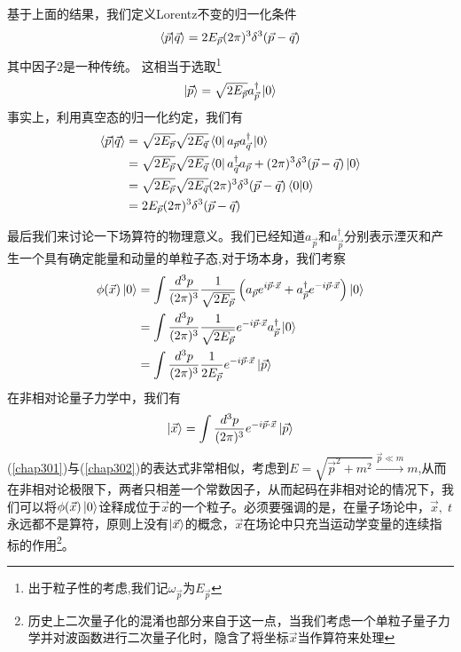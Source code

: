 基于上面的结果，我们定义Lorentz不变的归一化条件
\begin{equation}
    \braket{\vec{p}}{\vec{q}}=2E_{\vec{p}}(2\pi)^{3}\delta^{3}(\vec{p}-\vec{q})
\end{equation}
其中因子2是一种传统。
这相当于选取\footnote{出于粒子性的考虑,我们记$\omega_{\vec{p}}$为$E_{\vec{p}}$}
\begin{equation}
    \ket{\vec{p}}=\sqrt{2E_{\vec{p}}}a^{\dagger}_{\vec{p}}\ket{0}
\end{equation}
事实上，利用真空态的归一化约定，我们有
\begin{equation}
\begin{aligned}
     \braket{\vec{p}}{\vec{q}}&=\sqrt{2E_{\vec{p}}}\sqrt{2E_{\vec{q}}}\bra{0}a_{\vec{p}}a^{\dagger}_{\vec{q}}\ket{0}\\
     &=\sqrt{2E_{\vec{p}}}\sqrt{2E_{\vec{q}}}\bra{0}a^{\dagger}_{\vec{q}}a_{\vec{p}}+(2\pi)^{3}\delta^{3}(\vec{p}-\vec{q})\ket{0}\\
     &=\sqrt{2E_{\vec{p}}}\sqrt{2E_{\vec{q}}}(2\pi)^{3}\delta^{3}(\vec{p}-\vec{q})\braket{0}{0}\\
     &=2E_{\vec{p}}(2\pi)^{3}\delta^{3}(\vec{p}-\vec{q})
     \end{aligned}
\end{equation}

最后我们来讨论一下场算符的物理意义。我们已经知道$a_{\vec{p}}$和$a^{\dagger}_{\vec{p}}$分别表示湮灭和产生一个具有确定能量和动量的单粒子态,对于场本身，我们考察
\begin{equation}
\label{chap301}
\begin{aligned}
    \phi(\vec{x})\ket{0}&=\int \frac{d^{3}p}{(2\pi)^{3}}\frac{1}{\sqrt{2E_{\vec{p}}}}\left(a_{\vec{p}}e^{i\vec{p}\cdot\vec{x}}+a^{\dagger}_{\vec{p}}e^{-i\vec{p}\cdot\vec{x}}\right)\ket{0}\\
    &=\int \frac{d^{3}p}{(2\pi)^{3}}\frac{1}{\sqrt{2E_{\vec{p}}}}e^{-i\vec{p}\cdot\vec{x}}a^{\dagger}_{\vec{p}}\ket{0}\\
    &=\int \frac{d^{3}p}{(2\pi)^{3}}\frac{1}{2E_{\vec{p}}}e^{-i\vec{p}\cdot\vec{x}}\ket{\vec{p}}\\
    \end{aligned}
\end{equation}
在非相对论量子力学中，我们有
\begin{equation}
\label{chap302}
    \ket{\vec{x}}=\int \frac{d^{3}p}{(2\pi)^{3}}e^{-i\vec{p}\cdot\vec{x}}\ket{\vec{p}}
\end{equation}
(\ref{chap301})与(\ref{chap302})的表达式非常相似，考虑到$E=\sqrt{\vec{p}^{2}+m^{2}}\xrightarrow{\vec{p}\ll m}m$,从而在非相对论极限下，两者只相差一个常数因子，从而起码在非相对论的情况下，我们可以将$\phi(\vec{x})\ket{0}$诠释成位于$\vec{x}$的一个粒子。必须要强调的是，在量子场论中，$\vec{x},\;t$永远都不是算符，原则上没有$\ket{\vec{x}}$的概念，$\vec{x}$在场论中只充当运动学变量的连续指标的作用\footnote{历史上二次量子化的混淆也部分来自于这一点，当我们考虑一个单粒子量子力学并对波函数进行二次量子化时，隐含了将坐标$\vec{x}$当作算符来处理}。

